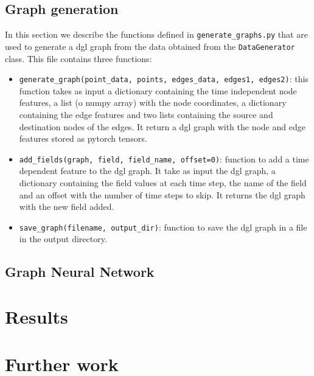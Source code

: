 \documentclass[11pt,a4paper]{article}
\begin{document}
\subsection{Graph generation}
In this section we describe the functions defined in \texttt{generate\_graphs.py} that are used to generate a dgl graph from the data obtained from the \texttt{DataGenerator} class. This file contains three functions: 
\begin{itemize}
    \item \texttt{generate\_graph(point\_data, points, edges\_data, edges1, edges2)}: this function takes as input a dictionary containing the time independent node features, a list (o numpy array) with the node coordinates, a dictionary containing the edge features and two lists containing the source and destination nodes of the edges. It return a dgl graph with the node and edge features stored as pytorch tensors.
    \item \texttt{add\_fields(graph, field, field\_name, offset=0)}: function to add a time dependent feature to the dgl graph. It take as input the dgl graph, a dictionary containing the field values at each time step, the name of the field and an offset with the number of time steps to skip. It returns the dgl graph with the new field added.
    \item \texttt{save\_graph(filename, output\_dir)}: function to save the dgl graph in a file in the output directory.
\end{itemize}

\subsection{Graph Neural Network}


\section{Results}


\section{Further work}

\newpage
\end{document}
